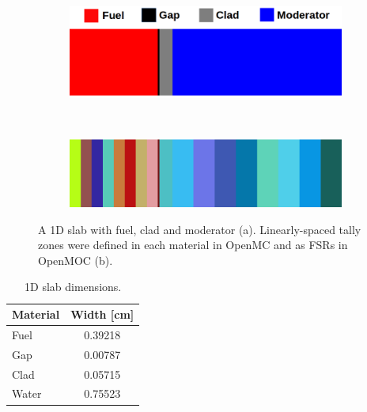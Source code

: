 \begin{figure}[h!]
\begin{subfigure}{\textwidth}
  \centering
  \includegraphics[width=0.7\linewidth]{figures/biases/slab/slab-simple-labels}
  \caption{}
\end{subfigure} \\
\begin{subfigure}{\textwidth}
  \centering
  \includegraphics[width=0.7\linewidth]{figures/biases/slab/slab-8x}
  \caption{}
\end{subfigure}
\caption[1D slab materials and geometry]{A 1D slab with fuel, clad and moderator (a). Linearly-spaced tally zones were defined in each material in OpenMC and as \ac{FSR}s in OpenMOC (b).}
\label{fig:chap4-slab}
\end{figure}

\begin{table}[h!]
  \centering
  \caption[1D slab dimensions]{1D slab dimensions.}
  \small
  \label{table:chap4-slab-widths} 
  \vspace{6pt}
  \begin{tabular}{l c}
  \toprule
  \multicolumn{1}{c}{\bf Material} &
  \multicolumn{1}{c}{\bf Width [cm]} \\
  \midrule
  Fuel &  0.39218 \\
  Gap &   0.00787 \\
  Clad &  0.05715 \\
  Water & 0.75523 \\
  \bottomrule
\end{tabular}
\end{table}

